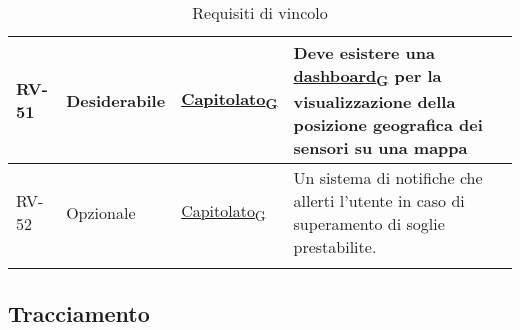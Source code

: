 \begin{longtable}{|>{\centering\arraybackslash}m{}|>{\centering\arraybackslash}m{}|>{\centering\arraybackslash}m{}|>{\centering\arraybackslash}m{}|}
	RV-51           & Desiderabile        & \href{https://7last.github.io/docs/rtb/documentazione-interna/glossario\#capitolato}{Capitolato\textsubscript{G}}     & Deve esistere una \href{https://7last.github.io/docs/rtb/documentazione-interna/glossario\#dashboard}{dashboard\textsubscript{G}} per la visualizzazione della posizione geografica dei sensori su una mappa
	\\\hline
	RV-52           & Opzionale           & \href{https://7last.github.io/docs/rtb/documentazione-interna/glossario\#capitolato}{Capitolato\textsubscript{G}}     & Un sistema di notifiche che allerti l'utente in caso di superamento di soglie prestabilite.
	\\\hline
	\caption{Requisiti di vincolo}
\end{longtable}

\subsection{Tracciamento}
